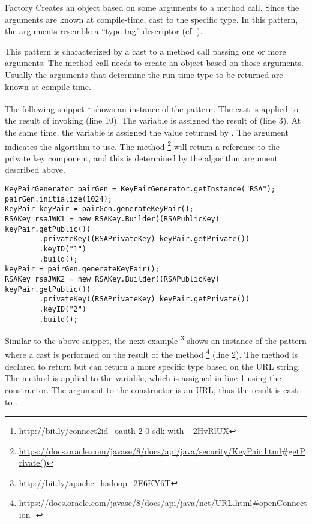 \begin{pattern}{Factory}
Creates an object based on some arguments to a method call.
Since the arguments are known at compile-time, cast to the specific type.
In this pattern, the arguments resemble a ``type tag'' descriptor (cf.
).

This pattern is characterized by a cast to a method call passing one or more arguments.
The method call needs to create an object based on those arguments.
Usually the arguments that determine the run-time type to be returned are known at compile-time.

\instances{}
The following snippet%
\footnote{\url{http://bit.ly/connect2id_oauth-2-0-sdk-with-_2HvRlUX}}
shows an instance of the \thisp{} pattern.
The cast is applied to the result of invoking 
(line 10).
The variable  is assigned the result of  (line 3).
At the same time, the  variable is assigned the value returned by .
The argument  indicates the algorithm to use.
%
%
The method%
\footnote{\url{https://docs.oracle.com/javase/8/docs/api/java/security/KeyPair.html\#getPrivate()}}
will return a reference to the private key component,
and this is determined by the algorithm argument described above.

\begin{verbatim}
KeyPairGenerator pairGen = KeyPairGenerator.getInstance("RSA");
pairGen.initialize(1024);
KeyPair keyPair = pairGen.generateKeyPair();
RSAKey rsaJWK1 = new RSAKey.Builder((RSAPublicKey) keyPair.getPublic())
        .privateKey((RSAPrivateKey) keyPair.getPrivate())
        .keyID("1")
        .build();
keyPair = pairGen.generateKeyPair();
RSAKey rsaJWK2 = new RSAKey.Builder((RSAPublicKey) keyPair.getPublic())
        .privateKey((RSAPrivateKey) keyPair.getPrivate())
        .keyID("2")
        .build();
\end{verbatim}

Similar to the above snippet, the next example%
\footnote{\url{http://bit.ly/apache_hadoop_2E6KY6T}}
shows an instance of the \thisp{} pattern where a cast is performed on the result of the  method%
\footnote{\url{https://docs.oracle.com/javase/8/docs/api/java/net/URL.html\#openConnection--}}
(line 2).
The method is declared to return  but can return a more specific type based on the URL string.
The  method is applied to the  variable,
which is assigned in line 1 using the  constructor.
The argument to the constructor is an  URL,
thus the result is cast to .


\end{pattern}
